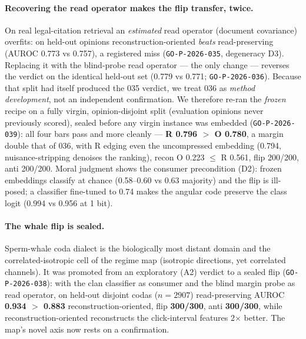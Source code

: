\documentclass[11pt]{article}
\theoremstyle{remark}
\newcommand{\seal}[1]{\texttt{GO-P-2026-#1}}
\begin{document}
\paragraph{Recovering the read operator makes the flip transfer, twice.} On real
legal-citation retrieval an \emph{estimated} read operator (document covariance) overfits:
on held-out opinions reconstruction-oriented \emph{beats} read-preserving (AUROC 0.773 vs
0.757), a registered miss (\seal{035}, degeneracy D3). Replacing it with the blind-probe
read operator --- the only change --- reverses the verdict on the identical held-out set
(0.779 vs 0.771; \seal{036}). Because that split had itself produced the 035 verdict, we
treat 036 as \emph{method development}, not an independent confirmation. We therefore re-ran
the \emph{frozen} recipe on a fully virgin,
opinion-disjoint split (evaluation opinions never previously scored), sealed before any
virgin instance was embedded (\seal{039}): all four bars pass and more cleanly ---
\textbf{R 0.796 $>$ O 0.780}, a margin double that of 036, with R edging even the
uncompressed embedding (0.794, nuisance-stripping denoises the ranking), recon
O 0.223 $\le$ R 0.561, flip 200/200, anti 200/200. Moral judgment shows the consumer
precondition (D2): frozen embeddings classify at chance (0.58--0.60 vs 0.63 majority) and
the flip is ill-posed; a classifier fine-tuned to 0.74 makes the angular code preserve the
class logit (0.994 vs 0.956 at 1 bit).

\paragraph{The whale flip is sealed.} Sperm-whale coda dialect is the biologically most
distant domain and the correlated-isotropic cell of the regime map (isotropic directions,
yet correlated channels). It was promoted from an exploratory (A2) verdict to
a sealed flip (\seal{038}): with the clan classifier as consumer and the blind margin
probe as read operator, on held-out disjoint codas ($n=2907$) read-preserving AUROC
\textbf{0.934 $>$ 0.883} reconstruction-oriented, flip \textbf{300/300}, anti
\textbf{300/300}, while reconstruction-oriented reconstructs the click-interval features
2$\times$ better. The map's novel axis now rests on a confirmation.
\end{document}

